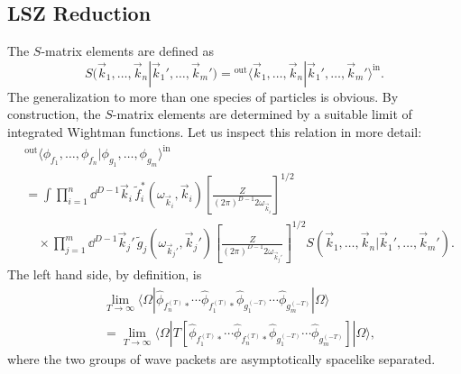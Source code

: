 \subsection{LSZ Reduction}

The \(S\)-matrix elements are defined as
\[
  S(\vec k_1,\ldots,\vec k_n|\vec k_1',\ldots,\vec k_m')
  =
  {}^{\mathrm{out}}\langle
  \vec k_1,\ldots,\vec k_n
  |\vec k_1',\ldots,\vec k_m'
  \rangle^{\mathrm{in}} .
\]
The generalization to more than one species of particles is obvious. By
construction, the \(S\)-matrix elements are determined by a suitable limit of
integrated Wightman functions. Let us inspect this relation in more detail:
\[
\begin{aligned}
&{}^{\mathrm{out}}\langle
  \phi_{f_1},\ldots,\phi_{f_n}
  |\phi_{g_1},\ldots,\phi_{g_m}
  \rangle^{\mathrm{in}}
\\
&=
  \int
  \prod_{i=1}^n \dd^{D-1}\vec k_i\,
  \widetilde f_i^*(\omega_{\vec k_i},\vec k_i)
  \left[
    \frac{Z}{(2\pi)^{D-1}2\omega_{\vec k_i}}
  \right]^{1/2}
\\
&\quad\times
  \prod_{j=1}^m \dd^{D-1}\vec k_j'\,
  \widetilde g_j(\omega_{\vec k_j'},\vec k_j')
  \left[
    \frac{Z}{(2\pi)^{D-1}2\omega_{\vec k_j'}}
  \right]^{1/2}
  S(\vec k_1,\ldots,\vec k_n|\vec k_1',\ldots,\vec k_m') .
\end{aligned}
\]
The left hand side, by definition, is
\[
\begin{aligned}
&\lim_{T\to\infty}
  \langle\Omega|
  \hat\phi_{f_n^{(T)}*}\cdots\hat\phi_{f_1^{(T)}*}
  \hat\phi_{g_1^{(-T)}}\cdots\hat\phi_{g_m^{(-T)}}|\Omega\rangle
\\
&=
  \lim_{T\to\infty}
  \langle\Omega|
  T\!\left[
  \hat\phi_{f_1^{(T)}*}\cdots
  \hat\phi_{f_n^{(T)}*}
  \hat\phi_{g_1^{(-T)}}\cdots
  \hat\phi_{g_m^{(-T)}}\right]
  |\Omega\rangle ,
\end{aligned}
\]
where the two groups of wave packets are asymptotically spacelike separated.

\begin{center}
\end{center}


